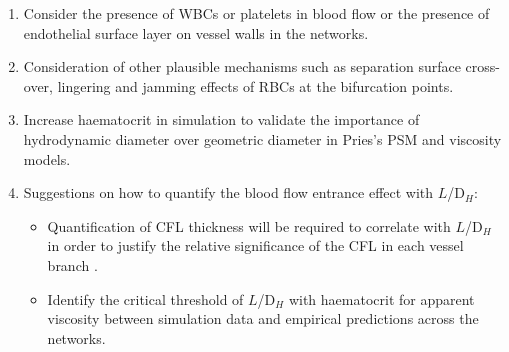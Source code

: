 \begin{enumerate}
    \item Consider the presence of WBCs or platelets in blood flow or the presence of endothelial surface layer on vessel walls in the networks.
    \item Consideration of other plausible mechanisms such as separation surface cross-over, lingering and jamming effects of RBCs at the bifurcation points. 
    \item Increase haematocrit in simulation to validate the importance of hydrodynamic diameter over geometric diameter in Pries's PSM and viscosity models. 
    \item Suggestions on how to quantify the blood flow entrance effect with $L$/D$_{H}$:
    \begin{itemize}
        \item Quantification of CFL thickness will be required to correlate with $L$/D$_{H}$ in order to justify the relative significance of the CFL in each vessel branch .
        \item Identify the critical threshold of $L$/D$_{H}$ with haematocrit for apparent viscosity between simulation data and empirical predictions across the networks.  
    \end{itemize}
\end{enumerate}








